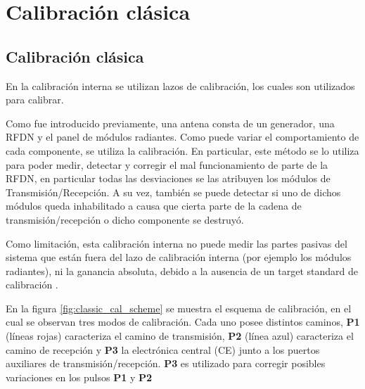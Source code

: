 
\chapter{Calibración clásica}
\label{ch:objetivo}

\section{Calibración clásica}

En la calibración interna se utilizan lazos de calibración, los cuales son utilizados para calibrar.

Como fue introducido previamente, una antena consta de un generador, una RFDN y el panel de módulos radiantes. Como puede
variar el comportamiento de cada componente, se utiliza la calibración. En particular, este método se lo utiliza para poder 
medir, detectar y corregir el mal funcionamiento de parte de la RFDN, en particular todas las desviaciones se las atribuyen 
los módulos de Transmisión/Recepción. A su vez, también se puede detectar si uno de dichos módulos queda inhabilitado a 
causa que cierta parte de la cadena de transmisión/recepción o dicho componente se destruyó.

Como limitación, esta calibración interna no puede medir las partes pasivas del sistema que están fuera del lazo de 
calibración interna (por ejemplo los módulos radiantes), ni la ganancia absoluta, debido a la ausencia de un target standard
de calibración \cite{Wang2010}. 


En la figura \ref{fig:classic_cal_scheme} se muestra el esquema de calibración, en el cual se observan tres modos de 
calibración. Cada uno posee distintos caminos, \textbf{P1} (líneas rojas) caracteriza el camino de transmisión, \textbf{P2}
(línea azul) caracteriza el camino de recepción y \textbf{P3} la electrónica central (CE) junto a los puertos auxiliares de 
transmisión/recepción. \textbf{P3} es utilizado para corregir posibles variaciones en los pulsos \textbf{P1} y \textbf{P2} 
\cite{Makhoul2012}

